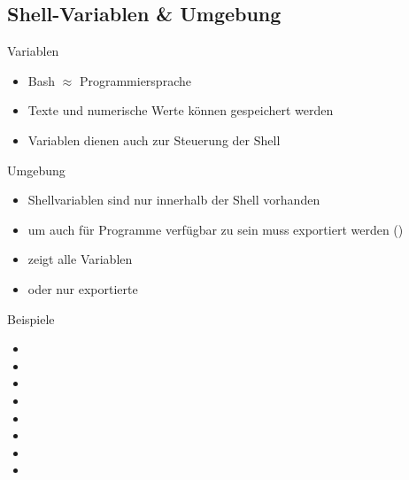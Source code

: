 \documentclass[aspectratio=43]{beamer}
\begin{document}
\subsection{Shell-Variablen \& Umgebung}
\begin{frame} 

	\begin{block}{Variablen} 
	\begin{itemize}
	\item Bash $\approx$ Programmiersprache 
	\item Texte und numerische Werte können gespeichert werden
	\item Variablen dienen auch zur Steuerung der Shell
	\end{itemize}
	\end{block}

\begin{block}{Umgebung}
\begin{itemize}
\item Shellvariablen sind nur innerhalb der Shell vorhanden 
\item um auch für Programme verfügbar zu sein muss exportiert werden ()
\item {}  zeigt alle Variablen
\item  {} oder  nur exportierte
\end{itemize}

\end{block}
\end{frame}

\begin{frame} 

	\begin{exampleblock}{Beispiele} 
	\begin{itemize}
	\item {}
	\item {}
	\item {}
	\item {}
	\item {}
	\item {}
	\item {}
	\item {}
	\end{itemize}
	\end{exampleblock}

\end{frame}
\end{document}
